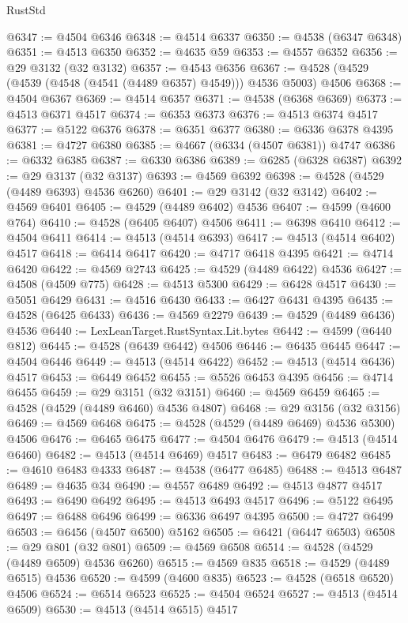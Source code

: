 \begin{lexlean}{RustStd}
\begin{coremodule}
@6347 := @4504 @6346
@6348 := @4514 @6337
@6350 := @4538 (@6347 @6348)
@6351 := @4513 @6350
@6352 := @4635 @59
@6353 := @4557 @6352
@6356 := @29 @3132 (@32 @3132)
@6357 := @4543 @6356
@6367 := @4528 (@4529 (@4539 (@4548 (@4541 (@4489 @6357) @4549))) @4536 @5003) @4506
@6368 := @4504 @6367
@6369 := @4514 @6357
@6371 := @4538 (@6368 @6369)
@6373 := @4513 @6371 @4517
@6374 := @6353 @6373
@6376 := @4513 @6374 @4517
@6377 := @5122 @6376
@6378 := @6351 @6377
@6380 := @6336 @6378 @4395
@6381 := @4727 @6380
@6385 := @4667 (@6334 (@4507 @6381)) @4747
@6386 := @6332 @6385
@6387 := @6330 @6386
@6389 := @6285 (@6328 @6387)
@6392 := @29 @3137 (@32 @3137)
@6393 := @4569 @6392
@6398 := @4528 (@4529 (@4489 @6393) @4536 @6260)
@6401 := @29 @3142 (@32 @3142)
@6402 := @4569 @6401
@6405 := @4529 (@4489 @6402) @4536
@6407 := @4599 (@4600 @764)
@6410 := @4528 (@6405 @6407) @4506
@6411 := @6398 @6410
@6412 := @4504 @6411
@6414 := @4513 (@4514 @6393)
@6417 := @4513 (@4514 @6402) @4517
@6418 := @6414 @6417
@6420 := @4717 @6418 @4395
@6421 := @4714 @6420
@6422 := @4569 @2743
@6425 := @4529 (@4489 @6422) @4536
@6427 := @4508 (@4509 @775)
@6428 := @4513 @5300
@6429 := @6428 @4517
@6430 := @5051 @6429
@6431 := @4516 @6430
@6433 := @6427 @6431 @4395
@6435 := @4528 (@6425 @6433)
@6436 := @4569 @2279
@6439 := @4529 (@4489 @6436) @4536
@6440 := LexLeanTarget.RustSyntax.Lit.bytes
@6442 := @4599 (@6440 @812)
@6445 := @4528 (@6439 @6442) @4506
@6446 := @6435 @6445
@6447 := @4504 @6446
@6449 := @4513 (@4514 @6422)
@6452 := @4513 (@4514 @6436) @4517
@6453 := @6449 @6452
@6455 := @5526 @6453 @4395
@6456 := @4714 @6455
@6459 := @29 @3151 (@32 @3151)
@6460 := @4569 @6459
@6465 := @4528 (@4529 (@4489 @6460) @4536 @4807)
@6468 := @29 @3156 (@32 @3156)
@6469 := @4569 @6468
@6475 := @4528 (@4529 (@4489 @6469) @4536 @5300) @4506
@6476 := @6465 @6475
@6477 := @4504 @6476
@6479 := @4513 (@4514 @6460)
@6482 := @4513 (@4514 @6469) @4517
@6483 := @6479 @6482
@6485 := @4610 @6483 @4333
@6487 := @4538 (@6477 @6485)
@6488 := @4513 @6487
@6489 := @4635 @34
@6490 := @4557 @6489
@6492 := @4513 @4877 @4517
@6493 := @6490 @6492
@6495 := @4513 @6493 @4517
@6496 := @5122 @6495
@6497 := @6488 @6496
@6499 := @6336 @6497 @4395
@6500 := @4727 @6499
@6503 := @6456 (@4507 @6500) @5162
@6505 := @6421 (@6447 @6503)
@6508 := @29 @801 (@32 @801)
@6509 := @4569 @6508
@6514 := @4528 (@4529 (@4489 @6509) @4536 @6260)
@6515 := @4569 @835
@6518 := @4529 (@4489 @6515) @4536
@6520 := @4599 (@4600 @835)
@6523 := @4528 (@6518 @6520) @4506
@6524 := @6514 @6523
@6525 := @4504 @6524
@6527 := @4513 (@4514 @6509)
@6530 := @4513 (@4514 @6515) @4517

\end{coremodule}
\end{lexlean}

